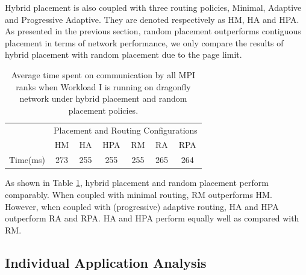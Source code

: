 \documentclass[conference,compsoc]{IEEEtran}
\begin{document}
Hybrid placement is also coupled with three routing policies, Minimal, Adaptive and Progressive Adaptive. They are denoted respectively as HM, HA and HPA. As presented in the previous section, random placement outperforms contiguous placement in terms of network performance, we only compare the results of hybrid placement with random placement due to the page limit.


\begin{table}[ht]
\begin{center}
\caption{Average time spent on communication by all MPI ranks when Workload I is running on dragonfly network under hybrid placement and random placement policies.} 
\label{tab: hyb-placement-wkld-commtime}
\begin{tabular}{l c c c c c c }
\toprule %
\toprule
&\multicolumn{6}{c}{Placement and Routing Configurations} \\ %
\cmidrule(l){2-7}
	      & HM & HA & HPA & RM & RA & RPA \\ %
\midrule %
Time(ms)  &273 &255 &255 &255 &265 &264  \\ %
\midrule %
\bottomrule %
\end{tabular}
\end{center}
\end{table}


As shown in Table \ref{tab: hyb-placement-wkld-commtime}, hybrid placement and random placement perform comparably. When coupled with minimal routing, RM outperforms HM. However, when coupled with (progressive) adaptive routing, HA and HPA outperform RA and RPA. HA and HPA perform equally well as compared with RM.  


\subsection{Individual Application Analysis}
\end{document}
